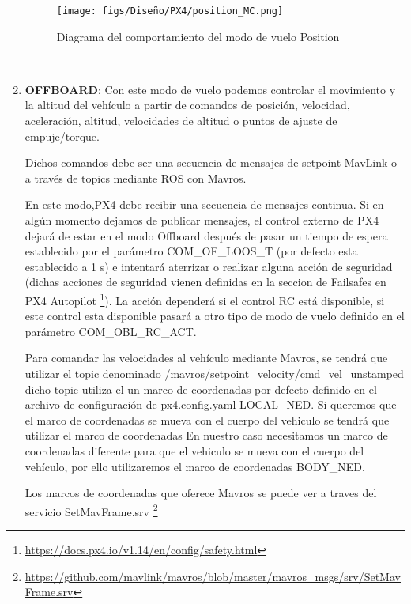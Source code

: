 \begin{enumerate}
    \begin{figure} [H]
      \begin{center}
        \texttt{[image: figs/Diseño/PX4/position\_MC.png]}
      \end{center}
      \caption{Diagrama del comportamiento del modo de vuelo Position}
      \label{fig:position_mode_px4}
    \end{figure}\

    \item \textbf{OFFBOARD}: Con este modo de vuelo podemos controlar el movimiento y la altitud del vehículo a partir de comandos de posición, velocidad, aceleración, altitud, velocidades de 
    altitud o puntos de ajuste de empuje/torque. 

    Dichos comandos debe ser una secuencia de mensajes de setpoint MavLink o a través de topics mediante ROS con Mavros.

    En este modo,PX4 debe recibir una secuencia de mensajes continua. Si en algún momento dejamos de publicar mensajes, el control externo de PX4 dejará de estar en el modo Offboard después
    de pasar un tiempo de espera establecido por el parámetro COM\_OF\_LOOS\_T (por defecto esta establecido a 1 s) e intentará aterrizar o realizar alguna acción de seguridad (dichas acciones 
    de seguridad vienen definidas en la seccion de Failsafes en PX4 Autopilot \footnote{\url{https://docs.px4.io/v1.14/en/config/safety.html}}). La acción dependerá
    si el control RC está disponible, si este control esta disponible pasará a otro tipo de modo de vuelo definido en el parámetro COM\_OBL\_RC\_ACT. 

    Para comandar las velocidades al vehículo mediante Mavros, se tendrá que utilizar el topic denominado /mavros/setpoint\_velocity/cmd\_vel\_unstamped dicho topic utiliza el un marco de coordenadas
    por defecto definido en el archivo de configuración de px4.config.yaml  LOCAL\_NED. Si queremos que el marco de coordenadas se mueva con el 
    cuerpo del vehiculo se tendrá que utilizar el marco de coordenadas
    En nuestro caso necesitamos un marco de coordenadas diferente para que el vehiculo se mueva
    con el cuerpo del vehículo, por ello utilizaremos el marco de coordenadas BODY\_NED. 

    Los marcos de coordenadas que oferece Mavros se puede ver a traves del servicio SetMavFrame.srv \footnote{\url{https://github.com/mavlink/mavros/blob/master/mavros_msgs/srv/SetMavFrame.srv}}
  \end{enumerate}

